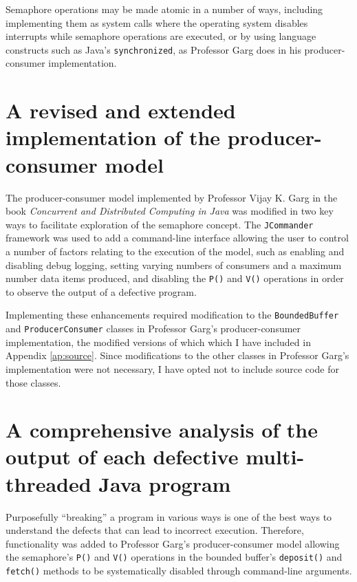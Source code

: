 \documentclass[12pt,a4paper]{article}
\begin{document}
		Semaphore operations may be made atomic in a number of ways, including implementing them as system calls where the operating system disables interrupts while semaphore operations are executed, or by using language constructs such as Java's \allowbreak\texttt{synchronized}, as Professor Garg does in his producer-consumer implementation.
 
	\section{A revised and extended implementation of the \allowbreak producer-consumer model}

		The producer-consumer model implemented by Professor Vijay K. Garg in the book \textit{Concurrent and Distributed Computing in Java} was modified in two key ways to facilitate exploration of the semaphore concept. The \texttt{JCommander} framework was used to add a command-line interface allowing the user to control a number of factors relating to the execution of the model, such as enabling and disabling debug logging, setting varying numbers of consumers and a maximum number data items produced, and disabling the \texttt{P()} and \texttt{V()} operations in order to observe the output of a defective program.

		Implementing these enhancements required modification to the \texttt{BoundedBuffer} and \texttt{ProducerConsumer} classes in Professor Garg's producer-consumer implementation, the modified versions of which which I have included in Appendix \ref{ap:source}. Since modifications to the other classes in Professor Garg's implementation were not necessary, I have opted not to include source code for those classes.

	\section{A comprehensive analysis of the output of each defective multi-threaded Java program}

		Purposefully ``breaking'' a program in various ways is one of the best ways to understand the defects that can lead to incorrect execution. Therefore, functionality was added to Professor Garg's producer-consumer model allowing the semaphore's \texttt{P()} and \texttt{V()} operations in the bounded buffer's \texttt{deposit()} and \texttt{fetch()} methods to be systematically disabled through command-line arguments.
\end{document}
